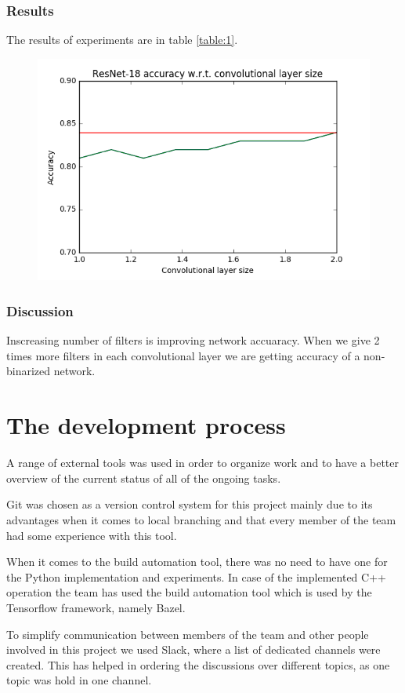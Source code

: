\documentclass[licencjacka]{pracamgr}
\begin{document}
		\subsection{Results}
		 The results of experiments are in table \ref{table:1}.
		\begin{figure}[h]
				\centering
				\includegraphics[width=\textwidth]{images/filter-ratio}
			\end{figure}
		\subsection{Discussion}
			Inscreasing number of filters is improving network accuaracy. When we give 2 times more filters in each convolutional layer we are getting accuracy of a non-binarized network.

\chapter{The development process}
	A range of external tools was used in order to organize work and to have a better overview of the current status of all of the ongoing tasks.

	Git was chosen as a version control system for this project mainly due to its advantages when it comes to local branching and that every member of the team had some experience with this tool.

	When it comes to the build automation tool, there was no need to have one for the Python implementation and experiments. In case of the implemented C++ operation the team has used the build automation tool which is used by the Tensorflow framework, namely Bazel.	

	To simplify communication between members of the team and other people involved in this project we used Slack, where a list of dedicated channels were created. This has helped in ordering the discussions over different topics, as one topic was hold in one channel.
\end{document}
